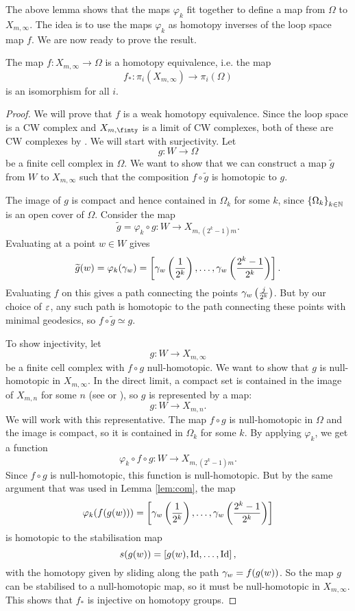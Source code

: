 The above lemma shows that the maps $\varphi_k$ fit together to define
a map from $\Omega$ to $X_{m,\infty}$.
The idea is to use the maps $\varphi_k$ as homotopy inverses of the
loop space map $f$. We are now ready to prove the result.

\begin{theorem}
  \label{thm:loekker}
  The map $f : X_{m,\infty} \to \Omega$ is a homotopy
  equivalence, i.e. the map
  \[f_* : \pi_i(X_{m,\infty}) \to \pi_i(\Omega)\]
  is an isomorphism for all $i$.
\end{theorem}

\begin{proof}
  We will prove that $f$ is a weak homotopy equivalence. Since the
  loop space is a CW complex and $X_{m,\finty}$ is a limit of CW
  complexes, both of these are CW complexes by \cite{milnor}.
  We will start with surjectivity. Let
  \[ g : W \to \Omega \]
  be a finite cell complex in $\Omega$. We want to show that we can
  construct a map $\widetilde g$ from $W$ to $X_{m,\infty}$ such that
  the composition $f\circ \widetilde g$ is homotopic to $g$.
  
  The image of $g$ is compact and hence contained in $\Omega_k$ for
  some $k$, since $\left\{ \Omega_k \right\}_{k\in\mathbb{N}}$ is an open cover of
  $\Omega$. Consider the map 
  \[ \widetilde g = \varphi_k\circ g : W \to X_{m,(2^k-1)m}. \]
  Evaluating at a point $w\in W$ gives
  \[ \widetilde g(w) = \varphi_k(\gamma_w) = \left[
    \gamma_w\left(\frac{1}{2^k}\right),\dots,
    \gamma_w\left(\frac{2^k-1}{2^k}\right) \right]. \]
  Evaluating $f$ on this gives a path connecting the points
  $\gamma_w\left(\frac{j}{2^k}\right)$. But by our choice of $\varepsilon$, any
  such path is homotopic to the path connecting these points with
  minimal geodesics, so $f\circ\widetilde g \simeq g$.

  To show injectivity, let
  \[ g : W \to X_{m,\infty}\]
  be a finite cell complex with $f\circ g$ null-homotopic. We want to
  show that $g$ is null-homotopic in $X_{m,\infty}$. In the
  direct limit, a compact set is contained in the image of $X_{m,n}$
  for some $n$ (see \cite[Proposition~A.1]{hatcher} or
  \cite[Chapter~9.4]{may}), so $g$ is represented by a map:
  \[ g : W \to X_{m,n}. \]
  We will work with this representative. The map $f\circ
  g$ is null-homotopic in $\Omega$ and the image is compact, so it is
  contained in $\Omega_k$ for some $k$. By applying $\varphi_k$, we
  get a function
  \[ \varphi_k\circ f\circ g : W \to X_{m,(2^k-1)m}. \]
  Since $f\circ g$ is null-homotopic, this function is
  null-homotopic. But by the same argument that was used in
  Lemma \ref{lem:com}, the map
  \[ \varphi_k(f(g(w))) = \left[
    \gamma_w\left(\frac{1}{2^k}\right),\dots,\gamma_w\left(\frac{2^k-1}{2^k}
    \right)\right] \] 
  is homotopic to the stabilisation map
  \[ s(g(w)) = \left[g(w),\operatorname{Id},\dots,\operatorname{Id}\right], \]
  with the homotopy given by sliding along the path $\gamma_w=f(g(w))$.
  So the map $g$ can be stabilised to a null-homotopic map, so it must
  be null-homotopic in $X_{m,\infty}$. This shows that $f_*$ is
  injective on homotopy groups.
\end{proof}

